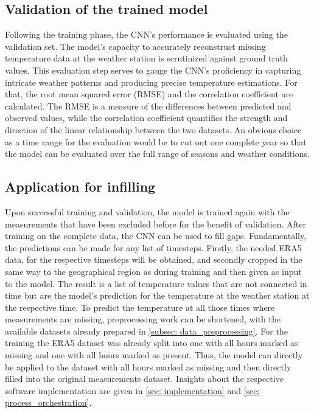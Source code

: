 \subsection{Validation of the trained model}
Following the training phase, the CNN's performance is evaluated using the validation set.
The model's capacity to accurately reconstruct missing temperature data at the weather station is scrutinized against ground truth values.
This evaluation step serves to gauge the CNN's proficiency in capturing intricate weather patterns and producing precise temperature estimations.
For that, the root mean squared error (RMSE) and the correlation coefficient are calculated.
The RMSE is a measure of the differences between predicted and observed values, while the correlation coefficient quantifies the strength and direction of the linear relationship between the two datasets.
An obvious choice as a time range for the evaluation would be to cut out one complete year so that the model can be evaluated over the full range of seasons and weather conditions.

\subsection{Application for infilling}
Upon successful training and validation, the model is trained again with the measurements that have been excluded before for the benefit of validation.
After training on the complete data, the CNN can be used to fill gaps.
Fundamentally, the predictions can be made for any list of timesteps. Firstly, the needed ERA5 data, for the respective timesteps will be obtained, and secondly cropped in the same way to the geographical region as during training and then given as input to the model.
The result is a list of temperature values that are not connected in time but are the model's prediction for the temperature at the weather station at the respective time.
To predict the temperature at all those times where measurements are missing, preprocessing work can be shortened, with the available datasets already prepared in \ref{subsec: data_preprocessing}.
For the training the ERA5 dataset was already split into one with all hours marked as missing and one with all hours marked as present.
Thus, the model can directly be applied to the dataset with all hours marked as missing and then directly filled into the original measurements dataset.
Insights about the respective software implementation are given in \autoref{sec: implementation} and \autoref{sec: process_orchestration}.